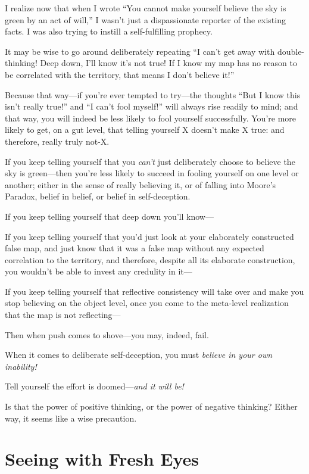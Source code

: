 {
 I realize now that when I wrote ``You cannot make
yourself believe the sky is green by an act of
will,'' I wasn't just a dispassionate
reporter of the existing facts. I was also trying to instill a
self-fulfilling prophecy.}

{
 It may be wise to go around deliberately repeating
``I can't get away with
double-thinking! Deep down, I'll know
it's not true! If I know my map has no reason to be
correlated with the territory, that means I don't
believe it!''}

{
 Because that way---if you're ever tempted to
try---the thoughts ``But I know this
isn't really true!'' and
``I can't fool
myself!'' will always rise readily to mind; and that
way, you will indeed be less likely to fool yourself successfully.
You're more likely to get, on a gut level, that telling
yourself X doesn't make X true: and therefore, really
truly not-X.}

{
 If you keep telling yourself that you
\textit{can't} just deliberately choose to believe the
sky is green---then you're less likely to succeed in
fooling yourself on one level or another; either in the sense of really
believing it, or of falling into Moore's Paradox,
belief in belief, or belief in self-deception.}

{
 If you keep telling yourself that deep down you'll
know---}

{
 If you keep telling yourself that you'd just look
at your elaborately constructed false map, and just know that it was a
false map without any expected correlation to the territory, and
therefore, despite all its elaborate construction, you
wouldn't be able to invest any credulity in it---}

{
 If you keep telling yourself that reflective consistency will take
over and make you stop believing on the object level, once you come to
the meta-level realization that the map is not reflecting---}

{
 Then when push comes to shove---you may, indeed, fail.}

{
 When it comes to deliberate self-deception, you must
\textit{believe in your own inability!}}

{
 Tell yourself the effort is doomed---\textit{and it will be!}}

{
 Is that the power of positive thinking, or the power of negative
thinking? Either way, it seems like a wise precaution.}

\myendsectiontext

\chapter{Seeing with Fresh Eyes}

